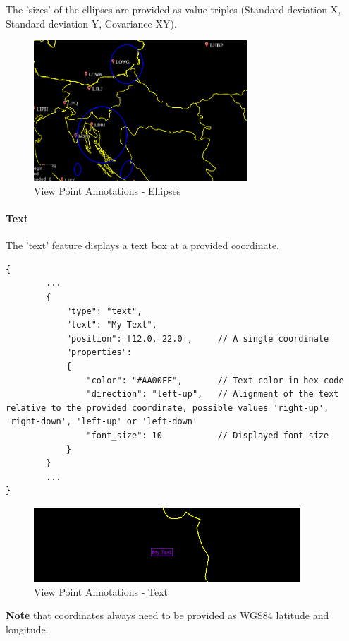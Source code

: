 The 'sizes' of the ellipses are provided as value triples (Standard deviation X, Standard deviation Y, Covariance XY).

\begin{figure}[H]
    \center
        \includegraphics[width=8cm]{figures/viewpoints_anno_example_ellipses.png}
    \caption{View Point Annotations - Ellipses} 
\end{figure}

\paragraph{Text} The 'text' feature displays a text box at a provided coordinate.

\begin{lstlisting}[basicstyle=\small\ttfamily]
{
        ...
        {
            "type": "text",
            "text": "My Text",
            "position": [12.0, 22.0],     // A single coordinate
            "properties":
            {
                "color": "#AA00FF",       // Text color in hex code
                "direction": "left-up",   // Alignment of the text relative to the provided coordinate, possible values 'right-up', 'right-down', 'left-up' or 'left-down'
                "font_size": 10           // Displayed font size
            }    
        }
        ...
}
\end{lstlisting}

\begin{figure}[H]
    \center
        \includegraphics[width=10cm]{figures/viewpoints_anno_example_text.png}
    \caption{View Point Annotations - Text} 
\end{figure}

\textbf{Note} that coordinates always need to be provided as WGS84 latitude and longitude. \\

